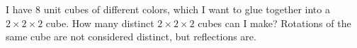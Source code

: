 I have $8$ unit cubes of different colors, which I want to glue together into a $2\times 2\times 2$ cube.  How many distinct $2\times 2\times 2$ cubes can I make?  Rotations of the same cube are not considered distinct, but reflections are.